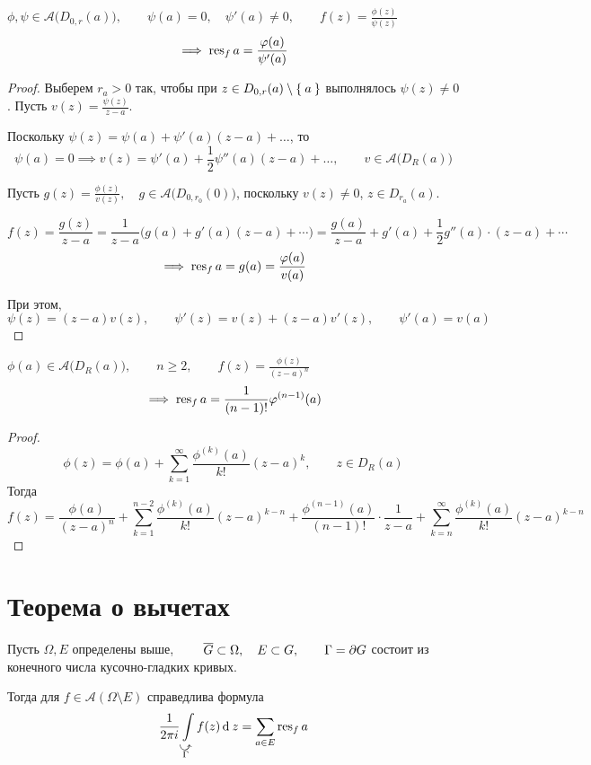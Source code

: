 \begin{statement}
	$ \phi, \psi \in \mathcal A \big( D_{0, r}(a) \big), \qquad \psi(a) = 0, \quad \psi'(a) \ne 0, \qquad f(z) = \frac{\phi(z)}{\psi(z)} $
	$$ \implies \operatorname{res}_f a = \frac{\varphi(a)}{\psi'(a)} $$
\end{statement}

\begin{proof}
	Выберем $ r_a > 0 $ так, чтобы при $ z \in D_{0, r}(a) \setminus \Set{a} $ выполнялось $ \psi(z) \ne 0 $. Пусть $ v(z) = \frac{\psi(z)}{z - a} $.

	Поскольку $ \psi(z) = \psi(a) + \psi'(a) (z - a) + \dots $, то
	$$ \psi(a) = 0 \implies v(z) = \psi'(a) + \frac12 \psi''(a)(z - a) + \dots, \qquad v \in \mathcal A \big( D_R(a) \big) $$

	Пусть $ g(z) = \frac{\phi(z)}{v(z)}, \quad g \in \mathcal A \big( D_{0, r_0}(0) \big) $, поскольку $ v(z) \ne 0 $, $ z \in D_{r_a}(a) $.

	$$ f(z) = \frac{g(z)}{z - a} = \frac1{z - a} \big( g(a) + g'(a)(z - a) + \cdots) = \frac{g(a)}{z - a} + g'(a) + \frac12g''(a) \cdot (z - a) + \cdots $$
	$$ \implies \operatorname{res}_f a = g(a) = \frac{\varphi(a)}{v(a)} $$

	При этом,
	$$ \psi(z) = (z - a)v(z), \qquad \psi'(z) = v(z) + (z - a)v'(z), \qquad \psi'(a) = v(a) $$
\end{proof}

\begin{statement}\label{stmt:residues:2}
	$ \phi(a) \in \mathcal A \big( D_R(a) \big), \qquad n \ge 2, \qquad f(z) = \frac{\phi(z)}{(z - a)^n} $
	$$ \implies \operatorname{res}_f a = \frac1{(n - 1)!}\varphi^{(n - 1)}(a) $$
\end{statement}

\begin{proof}
	$$ \phi(z) = \phi(a) + \sum_{k = 1}^\infty \frac{\phi^{(k)}(a)}{k!}(z - a)^k, \qquad z \in D_R(a) $$
	Тогда
	$$ f(z) = \frac{\phi(a)}{(z - a)^n} + \sum_{k = 1}^{n - 2} \frac{\phi^{(k)}(a)}{k!}(z - a)^{k - n} + \frac{\phi^{(n - 1)}(a)}{(n - 1)!} \cdot \frac1{z - a} + \sum_{k = n}^\infty \frac{\phi^{(k)}(a)}{k!}(z - a)^{k - n} $$
\end{proof}

\section{Теорема о вычетах}

\begin{theorem}
	Пусть $ \Omega, E $ определены выше, $ \qquad \overline G \subset \Omega, \quad E \subset G, \qquad \Gamma = \partial G $ состоит из конечного числа кусочно-гладких кривых.

	Тогда для $ f \in \mathcal A (\Omega \setminus E) $ справедлива формула
	$$ \frac1{2\pi i} \int\limits_{\curvedir \Gamma} f(z) \di z = \sum_{a \in E} \res_f a $$
\end{theorem}

